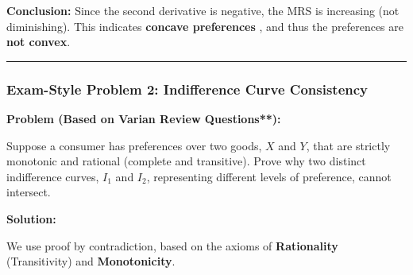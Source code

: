 \documentclass{article}
\begin{document}
\textbf{Conclusion:} Since the second derivative is negative, the MRS is increasing (not diminishing). This indicates \textbf{concave preferences} , and thus the preferences are \textbf{not convex}.

\vspace{1em}\hrule\vspace{1em}

\subsubsection*{Exam-Style Problem 2: Indifference Curve Consistency}

\textbf{Problem (Based on Varian Review Questions**):}

Suppose a consumer has preferences over two goods, $X$ and $Y$, that are strictly monotonic and rational (complete and transitive). Prove why two distinct indifference curves, $I_1$ and $I_2$, representing different levels of preference, cannot intersect.

\textbf{Solution:}

We use proof by contradiction, based on the axioms of \textbf{Rationality} (Transitivity) and \textbf{Monotonicity}.
\end{document}
